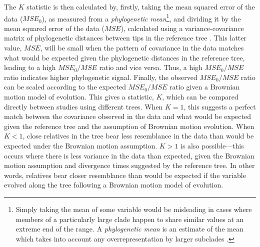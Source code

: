 The \(K\) statistic is then calculated by, firstly, taking the mean squared error of the data (\(MSE_0\)), as measured from a \emph{phylogenetic mean}\footnote{Simply taking the mean of some variable would be misleading in cases where members of a particularly large clade happen to share similar values at an extreme end of the range. A \emph{phylogenetic mean} is an estimate of the mean which takes into account any overrepresentation by larger subclades \autocite[see, for example,][]{garland_jr._polytomies_1999}.}, and dividing it by the mean squared error of the data (\(MSE\)), calculated using a variance-covariance matrix of phylogenetic distances between tips in the reference tree \autocite[see][ for a complete formula]{blomberg_testing_2003}. This latter value, \(MSE\), will be small when the pattern of covariance in the data matches what would be expected given the phylogenetic distances in the reference tree, leading to a high \(MSE_0/MSE\) ratio and vice versa. Thus, a high \(MSE_0/MSE\) ratio indicates higher phylogenetic signal. Finally, the observed \(MSE_0/MSE\) ratio can be scaled according to the expected \(MSE_0/MSE\) ratio given a Brownian motion model of evolution. This gives a statistic, \(K\), which can be compared directly between studies using different trees. When \(K = 1\), this suggests a perfect match between the covariance observed in the data and what would be expected given the reference tree and the assumption of Brownian motion evolution. When \(K < 1\), close relatives in the tree bear less resemblance in the data than would be expected under the Brownian motion assumption. \(K > 1\) is also possible---this occurs where there is less variance in the data than expected, given the Brownian motion assumption and divergence times suggested by the reference tree. In other words, relatives bear closer resemblance than would be expected if the variable evolved along the tree following a Brownian motion model of evolution.

